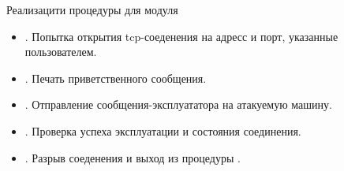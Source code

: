 \begin{listing}[H]
    \inputminted[firstline=64, lastline=78]{ruby}{resources/exploits/03_irc}
    \caption{Реализацити процедуры  для модуля }
    \label{lst:uircd-exploit-src}
\end{listing}

\begin{itemize}
    \item {}. Попытка открытия tcp-соеденения на адресс и порт, указанные пользователем.
    \item {}. Печать приветственного сообщения.
    \item {}. Отправление сообщения-эксплуататора на атакуемую машину.
    \item {}. Проверка успеха эксплуатации и состояния соединения.
    \item {}. Разрыв соеденения и выход из процедуры .
\end{itemize}